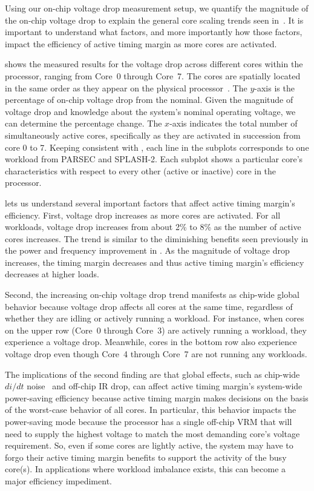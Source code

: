Using our on-chip voltage drop measurement setup, we quantify the magnitude of the on-chip voltage drop to explain the general core scaling trends seen in~. It is important to understand what factors, and more importantly how those factors, impact the efficiency of active timing margin as more cores are activated. 

 shows the measured results for the voltage drop across different cores within the processor, ranging from Core~0 through Core~7. The cores are spatially located in the same order as they appear on the physical processor~\cite{zyuban2013ibm}. The $y$-axis is the percentage of on-chip voltage drop from the nominal. Given the magnitude of voltage drop and knowledge about the system's nominal operating voltage, we can determine the percentage change. The $x$-axis indicates the total number of simultaneously active cores, specifically as they are activated in succession from core 0 to 7. Keeping consistent with , each line in the subplots corresponds to one workload from PARSEC and SPLASH-2. Each subplot shows a particular core's characteristics with respect to every other (active or inactive) core in the processor. 

 lets us understand several important factors that affect active timing margin's efficiency. First, voltage drop increases as more cores are activated. For all workloads, voltage drop increases from about 2\% to 8\% as the number of active cores increases. The trend is similar to the diminishing benefits seen previously in the power and frequency improvement in . As the magnitude of voltage drop increases, the timing margin decreases and thus active timing margin's efficiency decreases at higher loads. 

Second, the increasing on-chip voltage drop trend manifests as chip-wide global behavior because voltage drop affects all cores at the same time, regardless of whether they are idling or actively running a workload. For instance, when cores on the upper row (Core~0 through Core~3) are actively running a workload, they experience a voltage drop. Meanwhile, cores in the bottom row also experience voltage drop even though Core~4 through Core~7 are not running any workloads. 

The implications of the second finding are that global effects, such as chip-wide $di/dt$ noise~\cite{gupta2007understanding,miller2012vrsync,bertran2014voltage} and off-chip IR drop, can affect active timing margin's system-wide power-saving efficiency because active timing margin makes decisions on the basis of the worst-case behavior of all cores. In particular, this behavior impacts the power-saving mode because the processor has a single off-chip VRM that will need to supply the highest voltage to match the most demanding core's voltage requirement. So, even if some cores are lightly active, the system may have to forgo their active timing margin benefits to support the activity of the busy core(s). In applications where workload imbalance exists, this can become a major efficiency impediment. 

